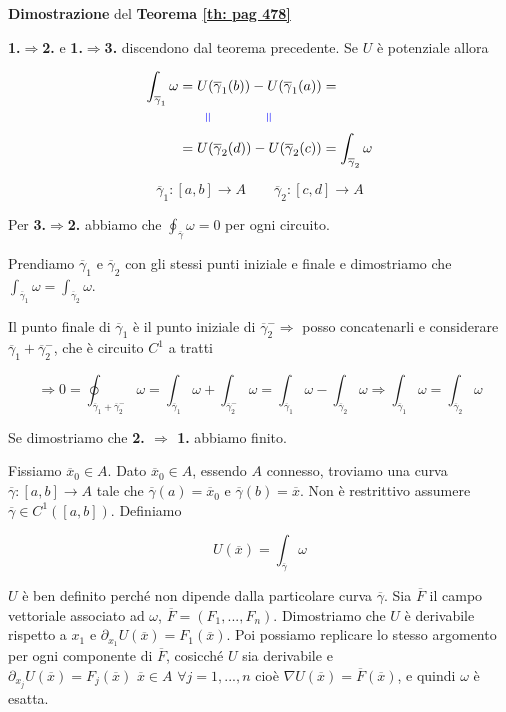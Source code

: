 \begin{dembar}
	\textbf{Dimostrazione} del \textbf{Teorema \ref{th: pag 478}}
	
	\textbf{1.$\Rightarrow $2.} e \textbf{1.$\Rightarrow $3.} discendono dal teorema precedente. Se $U$ è potenziale allora
	
	\begin{align*} 
		\int_{\overline{\gamma}_1}\omega
		&=U(\overline{\gamma}_1(b))-U(\overline{\gamma}_1(a))=
		\\
		& {\color{blue} \qquad \rotatebox{90}{=} \qquad\qquad \rotatebox{90}{=}}
		\\
		&= U(\overline{\gamma}_2(d))-U(\overline{\gamma}_2(c))= \int_{\overline{\gamma}_2}\omega
	\end{align*}
	
	{\color{blue} $$\overline{\gamma}_1 : [a,b]\to A \qquad \overline{\gamma}_2:[c,d]\to A$$}
	
	Per \textbf{3.$\Rightarrow$2.} abbiamo che $\oint_{\overline{\gamma}}\omega =0$ per ogni circuito.
	
	Prendiamo $\overline{\gamma}_1$ e $\overline{\gamma}_2$ con gli stessi punti iniziale e finale e dimostriamo che $\int_{\overline{\gamma}_1}\omega=\int_{\overline{\gamma}_2}\omega$.


	Il punto finale di $\overline{\gamma}_1$ è il punto iniziale di $\overline{\gamma}_2^- \Rightarrow$ posso concatenarli e considerare $\overline{\gamma}_1+\overline{\gamma}_2^-$, che è circuito $C^1$ a tratti
	
	$$\Rightarrow 0 =\oint_{\overline{\gamma}_1+\overline{\gamma}_2^-}\omega=\int_{\overline{\gamma}_1}\omega+\int_{\overline{\gamma}_2^-}\omega= \int_{\overline{\gamma}_1}\omega - \int_{\overline{\gamma}_2}\omega\Rightarrow \int_{\overline{\gamma}_1}\omega = \int_{\overline{\gamma}_2}\omega$$
	
	Se dimostriamo che \textbf{2. $\Rightarrow$ 1.} abbiamo finito.
	
	Fissiamo $\overline{x}_0\in A$. Dato $\overline{x}_0 \in A$,  essendo $A$ connesso, troviamo una curva $\overline{\gamma}:[a,b]\rightarrow A$ tale che $\overline{\gamma}(a)=\overline{x}_0$ e $\overline{\gamma}(b)=\overline{x}$. Non è restrittivo assumere $\overline{\gamma}\in C^1([a,b])$. Definiamo
	
	$$U(\overline{x})=\int_{\overline{\gamma}}\omega$$
	
	$U $ è ben definito perché non dipende dalla particolare curva $\overline{\gamma}$. Sia $\overline{F}$ il campo vettoriale associato ad $\omega$, $\overline{F}=(F_1,...,F_n)$. Dimostriamo che $U$ è derivabile rispetto a $x_1$ e $\partial_{x_1}U(\overline{x})=F_1(\overline{x})$. Poi possiamo replicare lo stesso argomento per ogni componente di $\overline{F}$, cosicché $U$ sia derivabile e $\partial_{x_j}U(\overline{x})=F_j(\overline{x})\,\, \overline{x}\in A\,\, \forall j=1,...,n$ cioè $\nabla U(\overline{x})=\overline{F}(\overline{x})$, e quindi $\omega$ è esatta.


\end{dembar}
